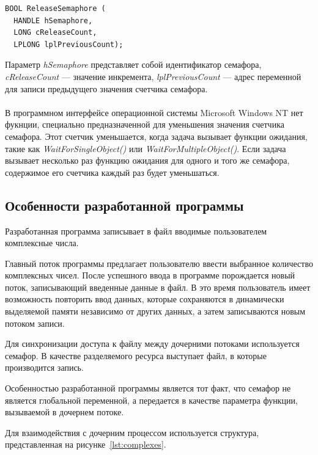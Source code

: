 \begin{lstlisting}[caption=Прототип функции увеличения счетчика семафора,
  label=lst:release_semaphore]
BOOL ReleaseSemaphore (
  HANDLE hSemaphore,
  LONG cReleaseCount,
  LPLONG lplPreviousCount);
\end{lstlisting}

Параметр \textit{hSemaphore} представляет собой идентификатор семафора,
\textit{cReleaseCount} --- значение инкремента, \textit{lplPreviousCount} ---
адрес переменной для записи предыдущего значения счетчика семафора.

\paragraph{}
В программном интерфейсе операционной системы Microsoft Windows NT нет фукнции,
специально предназначенной для уменьшения значения счетчика семафора.
Этот счетчик уменьшается, когда задача вызывает функции ожидания, 
такие как \textit{WaitForSingleObject()} или \textit{WaitForMultipleObject()}.
Если задача вызывает несколько раз функцию ожидания для одного и того же семафора,
содержимое его счетчика каждый раз будет уменьшаться.

\subsection{Особенности разработанной программы}
\label{ssec:program_description}

Разработанная программа записывает в файл вводимые пользователем комплексные числа. 

Главный поток программы предлагает пользователю ввести выбранное количество
комплексных чисел.
После успешного ввода в программе порождается новый поток, 
записывающий введенные данные в файл.
В это время пользователь имеет возможность повторить ввод данных, 
которые сохраняются в динамически выделяемой памяти независимо от других данных,
а затем записываются новым потоком записи.

Для синхронизации доступа к файлу между дочерними потоками используется семафор.
В качестве разделяемого ресурса выступает файл, в которые производится запись.

Особенностью разработанной программы является тот факт, что 
семафор не является глобальной переменной, а передается в качестве параметра 
функции, вызываемой в дочернем потоке.

Для взаимодействия с дочерним процессом используется структура,
представленная на рисунке~\ref{lst:complexes}. 

